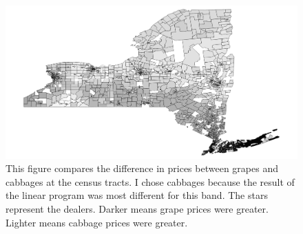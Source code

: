 \documentclass{report}
\begin{document}
\begin{figure}
\centering
\begin{framed}
\includegraphics[scale=.50]{stores_243_69}
\caption{This figure compares the difference in prices between grapes and cabbages at the census tracts. I chose cabbages because the result of the linear program was most different for this band. The stars represent the dealers. Darker means grape prices were greater. Lighter means cabbage prices were greater.}
\label{fig:stores_243_69}
\end{framed}
\end{figure}
\end{document}
